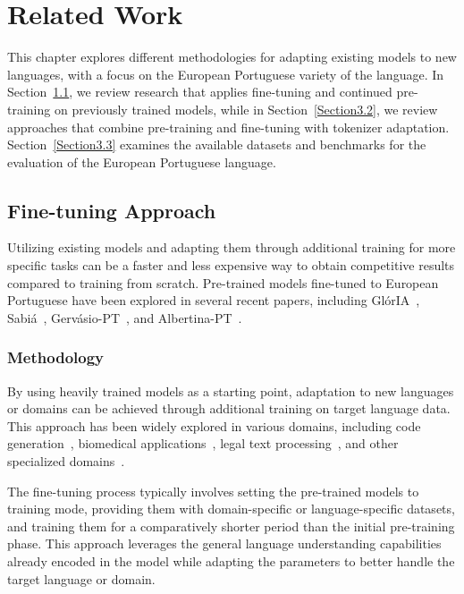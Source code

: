 \chapter{Related Work}
\label{Section3}\label{chap:related_work}

This chapter explores different methodologies for adapting existing models to new languages, with a focus on the European Portuguese variety of the language. In Section~\ref{Section3.1}, we review research that applies fine-tuning and continued pre-training on previously trained models, while in Section~\ref{Section3.2}, we review approaches that combine pre-training and fine-tuning with tokenizer adaptation. Section~\ref{Section3.3} examines the available datasets and benchmarks for the evaluation of the European Portuguese language.

\section{Fine-tuning Approach}\label{Section3.1}
Utilizing existing models and adapting them through additional training for more specific tasks can be a faster and less expensive way to obtain competitive results compared to training from scratch.
Pre-trained models fine-tuned to European Portuguese have been explored in several recent papers, including GlórIA~\cite{lopes2024gloriagenerativeopen}, Sabiá~\cite{10.1007/978-3-031-45392-2_15}, Gervásio-PT~\cite{santos2024advancing}, and Albertina-PT~\cite{rodrigues2023advancing}.

\subsection{Methodology}
By using heavily trained models as a starting point, adaptation to new languages or domains can be achieved through additional training on target language data. This approach has been widely explored in various domains, including code generation~\cite{chen2021evaluating}, biomedical applications~\cite{lee2020biobert}, legal text processing~\cite{chalkidis2020legal}, and other specialized domains~\cite{gururangan2020don}.

The fine-tuning process typically involves setting the pre-trained models to training mode, providing them with domain-specific or language-specific datasets, and training them for a comparatively shorter period than the initial pre-training phase. This approach leverages the general language understanding capabilities already encoded in the model while adapting the parameters to better handle the target language or domain.


